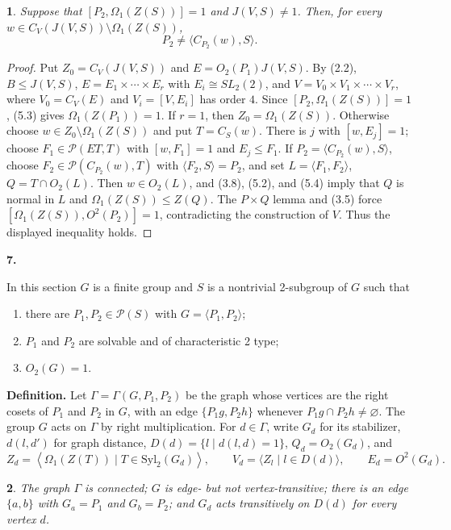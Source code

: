 \documentclass[11pt]{article}
\theoremstyle{plain}
\theoremstyle{stmplain}
\newtheorem{stm}{}[section]
\newcommand{\sect}[1]{\stepcounter{section}\par\vspace{14pt}%
  \begin{center}\textbf{#1.}\end{center}\vspace{2pt}}
\begin{document}
\begin{stm}\label{st:6.4}
Suppose that $[P_2,\Omega_1(Z(S))]=1$ and $J(V,S)\ne1$. Then, for every
$w\in C_V(J(V,S))\setminus\Omega_1(Z(S))$,
\[
  P_2\ne\langle C_{P_2}(w),S\rangle .
\]
\end{stm}

\begin{proof}
Put $Z_0=C_V(J(V,S))$ and $E=O_2(P_1)J(V,S)$. By (2.2),
$B\le J(V,S)$, $E=E_1\times\cdots\times E_r$ with
$E_i\cong SL_2(2)$, and
$V=V_0\times V_1\times\cdots\times V_r$, where
$V_0=C_V(E)$ and $V_i=[V,E_i]$ has order $4$. Since
$[P_2,\Omega_1(Z(S))]=1$, (5.3) gives
$\Omega_1(Z(P_1))=1$. If $r=1$, then $Z_0=\Omega_1(Z(S))$.
Otherwise choose $w\in Z_0\setminus\Omega_1(Z(S))$ and put
$T=C_S(w)$. There is $j$ with $[w,E_j]=1$; choose
$F_1\in\mathcal P(ET,T)$ with $[w,F_1]=1$ and $E_j\le F_1$.
If $P_2=\langle C_{P_2}(w),S\rangle$, choose
$F_2\in\mathcal P(C_{P_2}(w),T)$ with
$\langle F_2,S\rangle=P_2$, and set
$L=\langle F_1,F_2\rangle$, $Q=T\cap O_2(L)$. Then $w\in O_2(L)$,
and (3.8), (5.2), and (5.4) imply that $Q$ is normal in $L$ and
$\Omega_1(Z(S))\le Z(Q)$. The $P\times Q$ lemma and (3.5) force
$[\Omega_1(Z(S)),O^2(P_2)]=1$, contradicting the construction of $V$.
Thus the displayed inequality holds.
\end{proof}

\sect{7}

\noindent In this section $G$ is a finite group and $S$ is a nontrivial
2-subgroup of $G$ such that

\begin{enumerate}
\item[(i)] there are $P_1,P_2\in\mathcal P(S)$ with
  $G=\langle P_1,P_2\rangle$;
\item[(ii)] $P_1$ and $P_2$ are solvable and of characteristic 2 type;
\item[(iii)] $O_2(G)=1$.
\end{enumerate}

\noindent\textbf{Definition.} Let $\Gamma=\Gamma(G,P_1,P_2)$ be the graph whose
vertices are the right cosets of $P_1$ and $P_2$ in $G$, with an edge
$\{P_1g,P_2h\}$ whenever $P_1g\cap P_2h\ne\varnothing$. The group $G$
acts on $\Gamma$ by right multiplication. For $d\in\Gamma$, write
$G_d$ for its stabilizer, $d(l,d')$ for graph distance,
$D(d)=\{l\mid d(l,d)=1\}$, $Q_d=O_2(G_d)$, and
\[
Z_d=\left\langle\Omega_1(Z(T))\mid T\in\mathrm{Syl}_2(G_d)\right\rangle,
\qquad V_d=\langle Z_l\mid l\in D(d)\rangle,\qquad E_d=O^2(G_d).
\]

\begin{stm}\label{st:7.1}
The graph $\Gamma$ is connected; $G$ is edge- but not vertex-transitive;
there is an edge $\{a,b\}$ with $G_a=P_1$ and $G_b=P_2$; and $G_d$ acts
transitively on $D(d)$ for every vertex $d$.
\end{stm}
\end{document}
